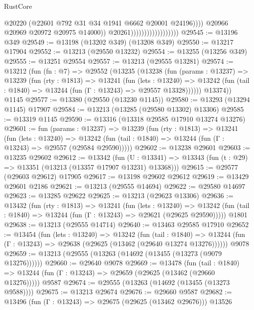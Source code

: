\begin{lexlean}{RustCore}
\begin{coremodule}
                                                  @20220
                                                  (@22601 @792 @31 @34 @1941 @6662 @20001 @24196))))
                                            @20966
                                            @20969
                                            @20972
                                            @20975
                                            @14000))
                                        @20261))))))))))))))))))
@29545 := @13196 @349
@29549 := @13198 (@13202 @349) (@13208 @349)
@29550 := @13217 @17904
@29552 := @13213 (@29550 @13232)
@29554 := @13255 (@13256 @349)
@29555 := @13251 @29554
@29557 := @13213 (@29555 @13281)
@29574 := @13212
    (fun (fn : @7) =>
    @29552
      (@13235
        (@13238
          (fun (params : @13237) =>
          @13239
            (fun (rty : @1813) =>
            @13241
              (fun (lets : @13240) =>
              @13242 (fun (tail : @1840) => @13244 (fun (Γ : @13243) => @29557 @13328))))))
        @13374))
    @1145
@29577 := @13380 (@29550 (@13230 @1145))
@29580 := @13293 (@13294 @1145) @17907
@29584 := @13213 (@13285 (@29580 @13302) @13306)
@29585 := @13319 @1145
@29590 := @13316 (@13318 @29585 @17910 @13274 @13276)
@29601 := fun (params : @13237) =>
  @13239
    (fun (rty : @1813) =>
    @13241
      (fun (lets : @13240) =>
      @13242 (fun (tail : @1840) => @13244 (fun (Γ : @13243) => @29557 (@29584 @29590)))))
@29602 := @13238 @29601
@29603 := @13235 @29602
@29612 := @13342
    (fun (U : @13341) => @13343 (fun (t : @29) => @13351 (@13213 (@13357 @17907 @13231) @13368)))
@29615 := @29577 (@29603 @29612) @17905
@29617 := @13198 @29602 @29612
@29619 := @13429 @29601 @2186
@29621 := @13213 (@29555 @14694)
@29622 := @29580 @14697
@29623 := @13285 @29622
@29625 := @13213 (@29623 @13306)
@29636 := @13432
    (fun (rty : @1813) =>
    @13241
      (fun (lets : @13240) =>
      @13242 (fun (tail : @1840) => @13244 (fun (Γ : @13243) => @29621 (@29625 @29590)))))
    @1801
@29638 := @13213 (@29555 @14714)
@29640 := @13463 @29585 @17910
@29652 := @13454
    (fun (lets : @13240) =>
    @13242
      (fun (tail : @1840) =>
      @13244 (fun (Γ : @13243) => @29638 (@29625 (@13462 (@29640 @13274 @13276))))))
    @9078
@29659 := @13213 (@29555 (@13263 (@14692 (@13455 (@13273 (@9079 @13276))))))
@29660 := @29640 @9078
@29669 := @13478
    (fun (tail : @1840) => @13244 (fun (Γ : @13243) => @29659 (@29625 (@13462 (@29660 @13276)))))
    @9587
@29674 := @29555 (@13263 (@14692 (@13455 (@13273 @9588))))
@29675 := @13213 @29674
@29676 := @29660 @9587
@29682 := @13496 (fun (Γ : @13243) => @29675 (@29625 (@13462 @29676))) @13526

\end{coremodule}
\end{lexlean}
